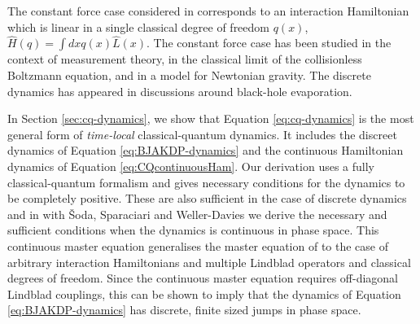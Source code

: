 \documentclass[aps,pra,showpacs,citeautoscript,amsmath,amssymb,floatfix,superscriptaddress,bbm, verbatim,amsfonts,changes,12pt,nofootinbib,longbibliography]{revtex4-2}
\def\L{{\hat{L}}}
\def\Hq{\hat{H}}
\begin{document}
The constant force case considered in \cite{diosi1995quantum} corresponds to an interaction Hamiltonian which is linear in a single classical degree of freedom $q(x)$,  $\Hq(q)=\int dx q(x)\L(x)$.  The constant force case has
been studied in the context of measurement theory\cite{diosi2014hybrid}, in the classical limit of the collisionless Boltzmann equation\cite{alicki2003completely}, and in a model for Newtonian gravity\cite{diosi2011gravity}. The discrete dynamics has appeared in discussions around black-hole evaporation\cite{poulinKITP}. %


 In Section \ref{sec:cq-dynamics}, we show that Equation \eqref{eq:cq-dynamics} is the most general form of  {\it time-local}\cite{ktimelocal_foot}
  classical-quantum dynamics. It includes the discreet dynamics of Equation \eqref{eq:BJAKDP-dynamics} and the continuous Hamiltonian dynamics of Equation \eqref{eq:CQcontinuousHam}.
 Our derivation uses a fully classical-quantum formalism and gives necessary conditions for the dynamics to be completely positive. %
These are also sufficient in the case of discrete dynamics and in \cite{UCLPawula} with  Šoda, Sparaciari and Weller-Davies we derive the necessary and sufficient conditions when the dynamics is continuous in phase space.\label{par:necsuf} This continuous master equation generalises the master equation of \cite{diosi1995quantum} to the case of arbitrary interaction Hamiltonians and multiple Lindblad operators and classical degrees of freedom. Since the continuous master equation requires off-diagonal Lindblad couplings, this can be shown to imply that the dynamics of Equation \eqref{eq:BJAKDP-dynamics}  has discrete, finite sized jumps in phase space\cite{UCLPawula}. 
\end{document}
